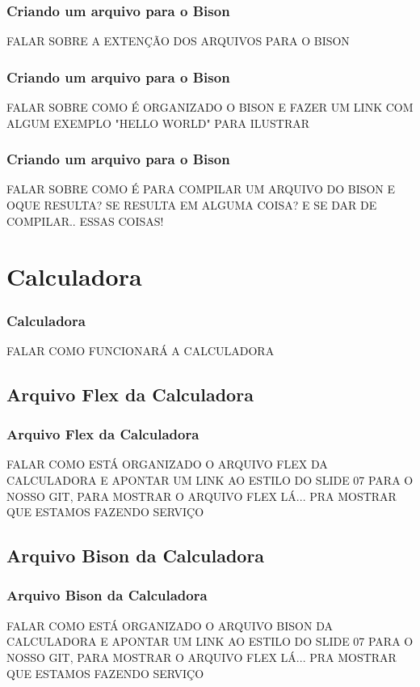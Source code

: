 \documentclass{beamer}
\begin{document}
\begin{frame}
\frametitle{Criando um arquivo para o Bison}
		FALAR SOBRE A EXTENÇÃO DOS ARQUIVOS PARA O BISON

\end{frame}

\begin{frame}
\frametitle{Criando um arquivo para o Bison}
		FALAR SOBRE COMO É ORGANIZADO O BISON E FAZER UM LINK COM ALGUM EXEMPLO "HELLO WORLD" PARA ILUSTRAR
	
\end{frame}

\begin{frame}
\frametitle{Criando um arquivo para o Bison}
		FALAR SOBRE COMO É PARA COMPILAR UM ARQUIVO DO BISON E OQUE RESULTA? SE RESULTA EM ALGUMA COISA? E SE DAR 
		DE COMPILAR.. ESSAS COISAS!
	
\end{frame}
\section{Calculadora}
\begin{frame}
\frametitle{Calculadora}
FALAR COMO FUNCIONARÁ A CALCULADORA
\end{frame}

\subsection{Arquivo Flex da Calculadora}

\begin{frame}
\frametitle{Arquivo Flex da Calculadora}
FALAR COMO ESTÁ ORGANIZADO O ARQUIVO FLEX DA CALCULADORA E APONTAR UM LINK AO ESTILO DO SLIDE 07 PARA O NOSSO GIT, PARA MOSTRAR
O ARQUIVO FLEX LÁ... PRA MOSTRAR QUE ESTAMOS FAZENDO SERVIÇO


\end{frame}

\subsection{Arquivo Bison da Calculadora}

\begin{frame}
\frametitle{Arquivo Bison da Calculadora}
FALAR COMO ESTÁ ORGANIZADO O ARQUIVO BISON DA CALCULADORA E APONTAR UM LINK AO ESTILO DO SLIDE 07 PARA O NOSSO GIT, PARA MOSTRAR
O ARQUIVO FLEX LÁ... PRA MOSTRAR QUE ESTAMOS FAZENDO SERVIÇO

\end{frame}
\end{document}

